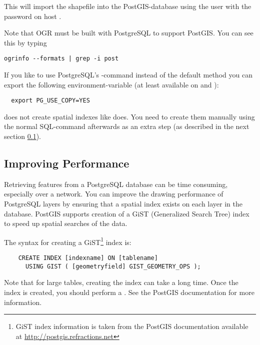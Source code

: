 This will import the shapefile  into the PostGIS-database
using the user  with the password  on host
.

Note that OGR must be built with PostgreSQL to support PostGIS.
You can see this by typing
\begin{verbatim}
ogrinfo --formats | grep -i post
\end{verbatim}

If you like to use PostgreSQL's -command instead of the default
 method you can export the following
environment-variable (at least available on \nix and \osx):
\begin{verbatim}
  export PG_USE_COPY=YES
\end{verbatim}

 does not create spatial indexes like 
does. You need to create them manually using the normal SQL-command
 afterwards as an extra step (as described in the next
section \ref{label_improve}).

\subsection{Improving Performance} \label{label_improve}

Retrieving features from a PostgreSQL database can be time consuming,
especially over a network. You can improve the drawing performance of
PostgreSQL layers by ensuring that a  spatial
index
exists on each layer in the database. PostGIS supports creation of a
 GiST
(Generalized Search Tree) index to speed up spatial searches of the data.

The syntax for creating a GiST\footnote{GiST index information is taken from the PostGIS
documentation available at \url{http://postgis.refractions.net}}
index is:

\begin{verbatim}
    CREATE INDEX [indexname] ON [tablename] 
      USING GIST ( [geometryfield] GIST_GEOMETRY_OPS );
\end{verbatim}

Note that for large tables, creating the index can take a long time. Once the
index is created, you should perform a . See the
PostGIS documentation \cite{PostGISweb} for more information.

